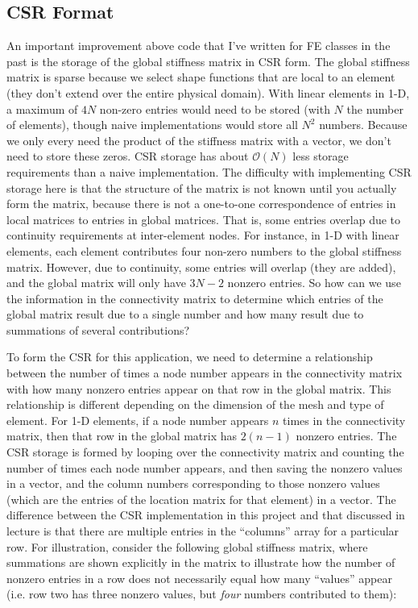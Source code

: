 \documentclass[10pt]{article}
\begin{document}
\subsection{CSR Format}
An important improvement above code that I've written for FE classes in the past is the storage of the global stiffness matrix in CSR form. The global stiffness matrix is sparse because we select shape functions that are local to an element (they don't extend over the entire physical domain). With linear elements in 1-D, a maximum of \(4N\) non-zero entries would need to be stored (with \(N\) the number of elements), though naive implementations would store all \(N^2\) numbers. Because we only every need the product of the stiffness matrix with a vector, we don't need to store these zeros. CSR storage has about \(\mathscr{O}(N)\) less storage requirements than a naive implementation. The difficulty with implementing CSR storage here is that the structure of the matrix is not known until you actually form the matrix, because there is not a one-to-one correspondence of entries in local matrices to entries in global matrices. That is, some entries overlap due to continuity requirements at inter-element nodes. For instance, in 1-D with linear elements, each element contributes four non-zero numbers to the global stiffness matrix. However, due to continuity, some entries will overlap (they are added), and the global matrix will only have \(3N-2\) nonzero entries. So how can we use the information in the connectivity matrix to determine which entries of the global matrix result due to a single number and how many result due to summations of several contributions?

To form the CSR for this application, we need to determine a relationship between the number of times a node number appears in the connectivity matrix with how many nonzero entries appear on that row in the global matrix. This relationship is different depending on the dimension of the mesh and type of element. For 1-D elements, if a node number appears \(n\) times in the connectivity matrix, then that row in the global matrix has \(2(n-1)\) nonzero entries. The CSR storage is formed by looping over the connectivity matrix and counting the number of times each node number appears, and then saving the nonzero values in a vector, and the column numbers corresponding to those nonzero values (which are the entries of the location matrix for that element) in a vector. The difference between the CSR implementation in this project and that discussed in lecture is that there are multiple entries in the ``columns'' array for a particular row. For illustration, consider the following global stiffness matrix, where summations are shown explicitly in the matrix to illustrate how the number of nonzero entries in a row does not necessarily equal how many ``values'' appear (i.e. row two has three nonzero values, but {\it four} numbers contributed to them):
\end{document}
